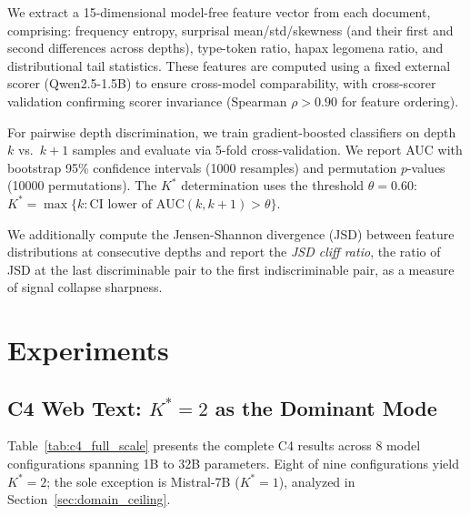 \documentclass[11pt,a4paper]{article}
\newcommand{\kstar}{K^{*}}
\newcommand{\auc}{\mathrm{AUC}}
\begin{document}
We extract a 15-dimensional model-free feature vector from each document, comprising:
frequency entropy, surprisal mean/std/skewness (and their first and second differences across depths), type-token ratio, hapax legomena ratio, and distributional tail statistics.
These features are computed using a fixed external scorer (Qwen2.5-1.5B) to ensure cross-model comparability, with cross-scorer validation confirming scorer invariance (Spearman $\rho > 0.90$ for feature ordering).

For pairwise depth discrimination, we train gradient-boosted classifiers on depth $k$ vs.\ $k\!+\!1$ samples and evaluate via 5-fold cross-validation.
We report AUC with bootstrap 95\% confidence intervals (1000 resamples) and permutation $p$-values (10000 permutations).
The $\kstar$ determination uses the threshold $\theta = 0.60$: $\kstar = \max\{k : \text{CI lower of } \auc(k,k\!+\!1) > \theta\}$.

We additionally compute the Jensen-Shannon divergence (JSD) between feature distributions at consecutive depths and report the \emph{JSD cliff ratio}, the ratio of JSD at the last discriminable pair to the first indiscriminable pair, as a measure of signal collapse sharpness.

\section{Experiments}

\subsection{C4 Web Text: $\kstar\!=\!2$ as the Dominant Mode}
\label{sec:c4}

Table~\ref{tab:c4_full_scale} presents the complete C4 results across 8 model configurations spanning 1B to 32B parameters.
Eight of nine configurations yield $\kstar\!=\!2$; the sole exception is Mistral-7B ($\kstar\!=\!1$), analyzed in Section~\ref{sec:domain_ceiling}.
\end{document}
